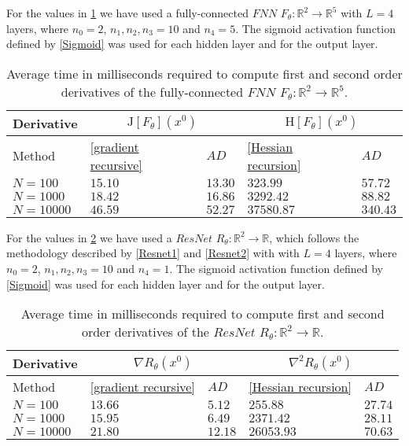 For the values in \cref{tab:advs ecplicit: FNN} we have used a fully-connected $FNN$ $F_{\theta} \colon \mathbb{R}^2 \to \mathbb{R}^5$ with $L = 4$ layers, where $n_0 = 2$, $n_1, n_2, n_3 = 10$ and $n_4 = 5$. The sigmoid activation function defined by \cref{Sigmoid} was used for each hidden layer and for the output layer. 
\begin{table}[H]\label{tab:advs ecplicit: FNN}
    \resizebox{\textwidth}{!}
    {
        \begin{tabular}{l l l l l }
            \toprule
            Derivative & \multicolumn{2}{c}{$\mathrm{J} \left[ F_{\theta} \right]\left(x^0\right)$}& \multicolumn{2}{c}{$\mathrm{H} \left[F_{\theta} \right]\left(x^0\right)$} \\ 
            \midrule
            Method & \cref{gradient recursive} & $AD$ & \cref{Hessian recursion} & $AD$ \\ 
            \midrule
            $N = 100$ & $15.10$ & $13.30$ & $323.99$ & $57.72$ \\ 
            \midrule
            $N = 1000$ & $18.42$ & $16.86$ & $3292.42$ & $88.82$ \\ 
            \midrule
            $N = 10000$ & $46.59$ & $52.27$ & $37580.87$ & $340.43$ \\ 
            \bottomrule
        \end{tabular}
    }
    \caption{Average time in milliseconds required to compute first and second order derivatives of the fully-connected $FNN$ $F_{\theta} \colon \mathbb{R}^2 \to \mathbb{R}^5$.}
\end{table}
For the values in \cref{tab:advs ecplicit: ResNet} we have used a $ResNet$ $R_{\theta} \colon \mathbb{R}^2 \to \mathbb{R}$, which follows the methodology described by \cref{Resnet1} and \cref{Resnet2} with with $L = 4$ layers, where $n_0 = 2$, $n_1, n_2, n_3 = 10$ and $n_4 = 1$. The sigmoid activation function defined by \cref{Sigmoid} was used for each hidden layer and for the output layer. 
\begin{table}[H]\label{tab:advs ecplicit: ResNet}
    \resizebox{\textwidth}{!}
    {
        \begin{tabular}{l l l l l }
            \toprule
            Derivative & \multicolumn{2}{c}{$\nabla R_{\theta} \left(x^0 \right)$}& \multicolumn{2}{c}{$\nabla^2 R_{\theta} \left(x^0 \right)$} \\ 
            \midrule
            Method & \cref{gradient recursive} & $AD$ & \cref{Hessian recursion} & $AD$ \\ 
            \midrule
            $N = 100$ & $13.66$ & $5.12$ & $255.88$ & $27.74$ \\ 
            \midrule
            $N = 1000$ & $15.95$ & $6.49$ & $2371.42$ & $28.11$ \\ 
            \midrule
            $N = 10000$ & $21.80$ & $12.18$ & $26053.93$ & $70.63$ \\ 
            \bottomrule
        \end{tabular}
    }
    \caption{Average time in milliseconds required to compute first and second order derivatives of the $ResNet$ $R_{\theta} \colon \mathbb{R}^2 \to \mathbb{R}$.}
\end{table}

